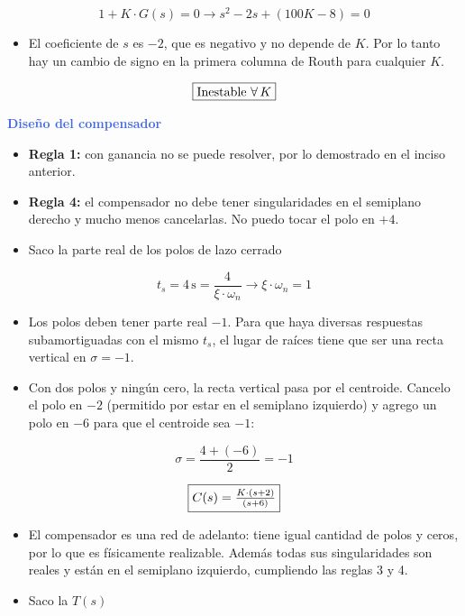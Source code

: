 \documentclass[10pt]{article}
\begin{document}
\[
1 + K \cdot G(s) = 0 \longrightarrow s^2 - 2s + (100K - 8) = 0
\]

\begin{itemize}
    \item El coeficiente de $s$ es $-2$, que es negativo y no depende de $K$. Por lo tanto hay un cambio de signo en la primera columna de Routh para cualquier $K$.
\end{itemize}

\[
\fbox{Inestable $\forall \, K$}
\]

\vspace{0.4cm}

\hspace{0.2cm} \textbf{\textcolor{RoyalBlue}{Diseño del compensador}}

\begin{itemize}
    \item \textbf{Regla 1:} con ganancia no se puede resolver, por lo demostrado en el inciso anterior.
    \item \textbf{Regla 4:} el compensador no debe tener singularidades en el semiplano derecho y mucho menos cancelarlas. No puedo tocar el polo en $+4$.
    \item Saco la parte real de los polos de lazo cerrado
\end{itemize}

\[
t_s = 4 \, \mathrm{s} = \frac{4}{\xi \cdot \omega_n} \longrightarrow \xi \cdot \omega_n = 1
\]

\begin{itemize}
    \item Los polos deben tener parte real $-1$. Para que haya diversas respuestas subamortiguadas con el mismo $t_s$, el lugar de raíces tiene que ser una recta vertical en $\sigma = -1$.
    \item Con dos polos y ningún cero, la recta vertical pasa por el centroide. Cancelo el polo en $-2$ (permitido por estar en el semiplano izquierdo) y agrego un polo en $-6$ para que el centroide sea $-1$:
\end{itemize}

\[
\sigma = \frac{4 + (-6)}{2} = -1
\]

\[
\fbox{$C(s) = \frac{K \cdot (s + 2)}{(s + 6)}$}
\]

\begin{itemize}
    \item El compensador es una red de adelanto: tiene igual cantidad de polos y ceros, por lo que es físicamente realizable. Además todas sus singularidades son reales y están en el semiplano izquierdo, cumpliendo las reglas 3 y 4.
    \item Saco la $T(s)$
\end{itemize}
\end{document}
